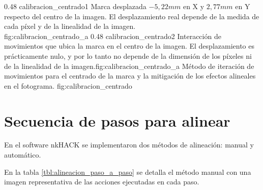 \subfigab
{0.48} {calibracion_centrado1} {Marca desplazada $-5,22 mm$ en X y $2,77 mm$ en Y respecto del centro de la imagen. El desplazamiento real depende de la medida de cada píxel y de la linealidad de la imagen.\\ \vphantom{1}}{fig:calibracion_centrado_a}
{0.48} {calibracion_centrado2} {Interacción de movimientos que ubica la marca en el centro de la imagen. El desplazamiento es prácticamente nulo, y por lo tanto no depende de la dimensión de los píxeles ni de la linealidad de la imagen.}{fig:calibracion_centrado_a}
   {Método de iteración de movimientos para el centrado de la marca y la mitigación de los efectos alineales en el fotograma.}
   {fig:calibracion_centrado}

\section{Secuencia de pasos para alinear}

En el software nkHACK se implementaron dos métodos de alineación: manual y automático.\par
En la tabla \ref{tbl:alineacion_paso_a_paso} se detalla el método manual con una imagen representativa de las acciones ejecutadas en cada paso.

